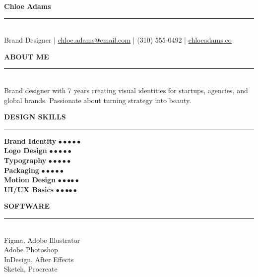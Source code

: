 \documentclass[11pt,a4paper]{article}
\begin{document}
\begin{center}
  \textcolor{headercolor}{{\Huge \textbf{Chloe Adams}}}\\[2pt]
  \textcolor{accent}{\rule{0.5\textwidth}{1.5pt}}\\[3pt]
  {\large Brand Designer} \quad|\quad
  \href{mailto:chloe.adams@email.com}{chloe.adams@email.com} \quad|\quad
  (310) 555-0492 \quad|\quad
  \href{https://chloeadams.co}{chloeadams.co}
\end{center}

\vspace{6pt}

\noindent
\begin{minipage}[t]{0.34\textwidth}
\small

\noindent\textcolor{accent}{\textbf{ABOUT ME}}\\
\rule{\linewidth}{0.4pt}\\[2pt]
Brand designer with 7 years creating visual identities for startups, agencies, and global brands. Passionate about turning strategy into beauty.

\vspace{6pt}
\noindent\textcolor{accent}{\textbf{DESIGN SKILLS}}\\
\rule{\linewidth}{0.4pt}

\vspace{2pt}
\noindent\textbf{Brand Identity} \quad \textcolor{accent}{$\bullet\bullet\bullet\bullet\bullet$}\\[1pt]
\noindent\textbf{Logo Design} \quad \textcolor{accent}{$\bullet\bullet\bullet\bullet\bullet$}\\[1pt]
\noindent\textbf{Typography} \quad \textcolor{accent}{$\bullet\bullet\bullet\bullet$}\textcolor{gray!60}{$\bullet$}\\[1pt]
\noindent\textbf{Packaging} \quad \textcolor{accent}{$\bullet\bullet\bullet\bullet$}\textcolor{gray!60}{$\bullet$}\\[1pt]
\noindent\textbf{Motion Design} \quad \textcolor{accent}{$\bullet\bullet\bullet$}\textcolor{gray!60}{$\bullet\bullet$}\\[1pt]
\noindent\textbf{UI/UX Basics} \quad \textcolor{accent}{$\bullet\bullet\bullet$}\textcolor{gray!60}{$\bullet\bullet$}

\vspace{6pt}
\noindent\textcolor{accent}{\textbf{SOFTWARE}}\\
\rule{\linewidth}{0.4pt}\\[2pt]
Figma, Adobe Illustrator\\
Adobe Photoshop\\
InDesign, After Effects\\
Sketch, Procreate


\end{minipage}
\end{document}
